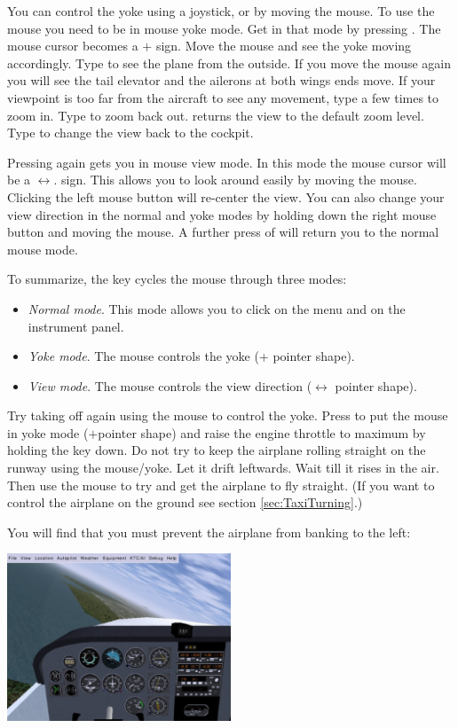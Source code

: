You can control the yoke using a joystick, or by moving the mouse. To use the
mouse you need to be in mouse yoke mode. Get in that mode by pressing .
The mouse cursor becomes a $+$ sign. Move the mouse and see the
yoke moving accordingly. Type  to see the plane from the outside. If you
move the mouse again you will see the tail elevator and the ailerons at both
wings ends move. If your viewpoint is too far from the aircraft to see any
movement, type  a few times to zoom in.
Type  to zoom back out.  returns the view to the default zoom
level. Type  to change the view back to the cockpit.

Pressing  again gets you in mouse view mode. In this mode the mouse cursor will
be a $\leftrightarrow$. sign. This allows you to look around easily by moving
the mouse. Clicking the left mouse button will re-center the view.  You can also
change your view direction in the normal and yoke modes by holding down the right
mouse button and moving the mouse. A further press of  will return you to the
normal mouse mode.

To summarize, the  key cycles the mouse through three modes:
\begin{itemize}
    \item \textit{Normal mode}. This mode allows you to
  click on the menu and on the instrument panel.
    \item \textit{Yoke mode}.
  The mouse controls the yoke (+ pointer shape).
    \item \textit{View mode}. The mouse controls the
  view direction ($\leftrightarrow$ pointer shape).
\end{itemize}

Try taking off again using the mouse to control the yoke. Press  to put
the mouse in yoke mode ($+$pointer shape) and raise the engine throttle to
maximum by holding the  key down. Do not try to keep the airplane
rolling straight on the runway using the mouse/yoke. Let it drift leftwards.
Wait till it rises in the air. Then use the mouse to try and get the
airplane to fly straight. (If you want to control the airplane on the
ground see section \ref{sec:TaxiTurning}.)

You will find that you must prevent the airplane from banking to the left:

\begin{center}
\includegraphics[width=0.5\textwidth]{img/tut_11}
\end{center}


